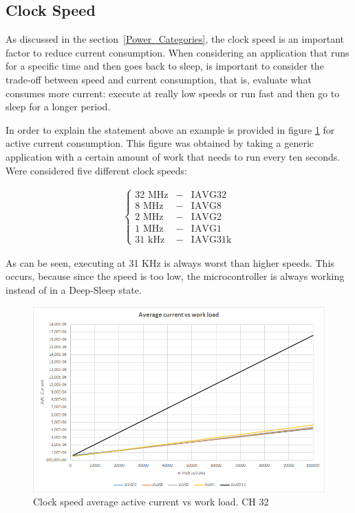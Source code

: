 \documentclass[11pt,a4paper]{report}
\begin{document}
\subsection{Clock Speed}

As discussed in the section~\ref{Power_Categories}, the clock speed is an important factor to reduce current consumption. When considering an application that runs for a specific time and then goes back to sleep, is important to consider the trade-off between speed and current consumption, that is, evaluate what consumes more current: execute at really low speeds or run fast and then go to sleep for a longer period. 

In order to explain the statement above an example is provided in figure \ref{fig:Average_power_vs_work_load_31K} for active current consumption. This figure was obtained by taking a generic application with a certain amount of work that needs to run every ten seconds. Were considered five different clock speeds:
 
\begin{eqnarray}\nonumber
\left\{\begin{matrix}
32 \text{ MHz} &-& \text{IAVG32}	\\ 
8 \text{ MHz} &-& \text{IAVG8}	\\ 
2 \text{ MHz} &-& \text{IAVG2}	\\ 
1 \text{ MHz} &-& \text{IAVG1}	\\ 
31 \text{ kHz} &-& \text{IAVG31k}
\end{matrix}\right.
\end{eqnarray}

As can be seen, executing at 31 KHz is always worst than higher speeds. This occurs, because since the speed is too low, the microcontroller is always working instead of in a Deep-Sleep state. 

\begin{figure}[ht!]
\centering
\includegraphics[width=0.9\linewidth]{./Average_power_vs_work_load_31K}
\caption{Clock speed average active current vs work load. CH 32 \cite{PIC24FJ128GA204} \cite{Power_saving_deep_sleep}}
\label{fig:Average_power_vs_work_load_31K}
\end{figure}
\end{document}
